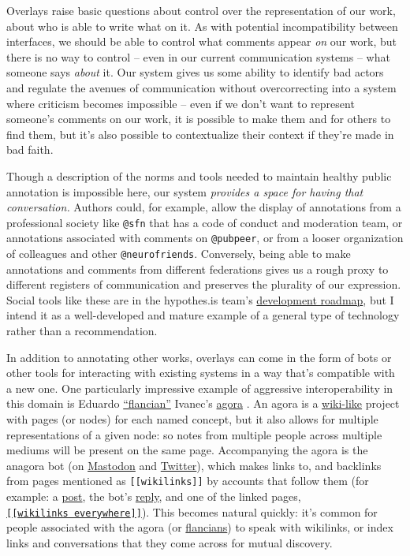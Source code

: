 Overlays raise basic questions about control over the representation of
our work, about who is able to write what on it. As with potential
incompatibility between interfaces, we should be able to control what
comments appear \emph{on} our work, but there is no way to control --
even in our current communication systems -- what someone says
\emph{about} it. Our system gives us some ability to identify bad actors
and regulate the avenues of communication without overcorrecting into a
system where criticism becomes impossible -- even if we don't want to
represent someone's comments on our work, it is possible to make them
and for others to find them, but it's also possible to contextualize
their context if they're made in bad faith.

Though a description of the norms and tools needed to maintain healthy
public annotation is impossible here, our system \emph{provides a space
for having that conversation.} Authors could, for example, allow the
display of annotations from a professional society like \texttt{@sfn}
that has a code of conduct and moderation team, or annotations
associated with comments on \texttt{@pubpeer}, or from a looser
organization of colleagues and other \texttt{@neurofriends}. Conversely,
being able to make annotations and comments from different federations
gives us a rough proxy to different registers of communication and
preserves the plurality of our expression. Social tools like these are
in the hypothes.is team's
\href{https://web.archive.org/web/20211015213849/https://github.com/hypothesis/product-backlog/projects/6}{development
roadmap}, but I intend it as a well-developed and mature example of a
general type of technology rather than a
recommendation.

In addition to annotating other works, overlays can come in the form of
bots or other tools for interacting with existing systems in a way
that's compatible with a new one. One particularly impressive example of
aggressive interoperability in this domain is Eduardo
\href{https://flancia.org/}{``flancian''} Ivanec's
\href{https://anagora.org/}{agora} \citep{ivanecFutureNoteTaking2021, velitchkovPersonalKnowledgeGraphs} . An agora is a
\href{https://anagora.org/wiki-like}{wiki-like} project with pages (or
nodes) for each named concept, but it also allows for multiple
representations of a given node: so notes from multiple people across
multiple mediums will be present on the same page. Accompanying the
agora is the anagora bot (on
\href{https://botsin.space/@agora}{Mastodon} and
\href{https://twitter.com/an_agora}{Twitter}), which makes links to, and
backlinks from pages mentioned as \texttt{{[}{[}wikilinks{]}{]}} by
accounts that follow them (for example: a
\href{https://social.coop/@jonny/108621001205679783}{post}, the bot's
\href{https://botsin.space/@agora/108621001318792297}{reply}, and one of
the linked pages,
\href{https://anagora.org/Wikilinks+Everywhere}{\texttt{{[}{[}wikilinks\ everywhere{]}{]}}}).
This becomes natural quickly: it's common for people associated with the
agora (or \href{https://flancia.org/manifesto/}{flancians}) to speak
with wikilinks, or index links and conversations that they come across
for mutual discovery.


